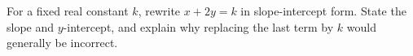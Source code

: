 For a fixed real constant $k$, rewrite $x+2y=k$ in slope-intercept form. State the slope and $y$-intercept, and explain why replacing the last term by $k$ would generally be incorrect.
